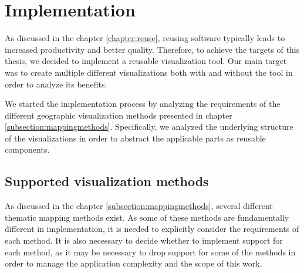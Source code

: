 
\chapter{Implementation}
\label{chapter:implementation}




As discussed in the chapter \ref{chapter:reuse}, reusing software typically leads to increased productivity and better quality. Therefore, to achieve the targets of this thesis, we decided to implement a reusable visualization tool. Our main target was to create multiple different visualizations both with and without the tool in order to analyze its benefits.

We started the implementation process by analyzing the requirements of the different geographic visualization methods presented in chapter \ref{subsection:mappingmethods}. Specifically, we analyzed the underlying structure of the visualizations in order to abstract the applicable parts as reusable components.

\section{Supported visualization methods}
As discussed in the chapter \ref{subsection:mappingmethods}, several different thematic mapping methods exist. As some of these methods are fundamentally different in implementation, it is needed to explicitly consider the requirements of each method. It is also necessary to decide whether to implement support for each method, as it may be necessary to drop support for some of the methods in order to manage the application complexity and the scope of this work.


